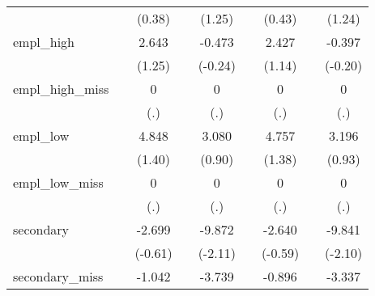 {\begin{tabular}{l*{8}{c}}
            &                     &      (0.38)         &                     &      (1.25)         &                     &      (0.43)         &                     &      (1.24)         \\
[1em]
empl\_high   &                     &       2.643         &                     &      -0.473         &                     &       2.427         &                     &      -0.397         \\
            &                     &      (1.25)         &                     &     (-0.24)         &                     &      (1.14)         &                     &     (-0.20)         \\
[1em]
empl\_high\_miss&                     &           0         &                     &           0         &                     &           0         &                     &           0         \\
            &                     &         (.)         &                     &         (.)         &                     &         (.)         &                     &         (.)         \\
[1em]
empl\_low    &                     &       4.848         &                     &       3.080         &                     &       4.757         &                     &       3.196         \\
            &                     &      (1.40)         &                     &      (0.90)         &                     &      (1.38)         &                     &      (0.93)         \\
[1em]
empl\_low\_miss&                     &           0         &                     &           0         &                     &           0         &                     &           0         \\
            &                     &         (.)         &                     &         (.)         &                     &         (.)         &                     &         (.)         \\
[1em]
secondary   &                     &      -2.699         &                     &      -9.872\sym{*}  &                     &      -2.640         &                     &      -9.841\sym{*}  \\
            &                     &     (-0.61)         &                     &     (-2.11)         &                     &     (-0.59)         &                     &     (-2.10)         \\
[1em]
secondary\_miss&                     &      -1.042         &                     &      -3.739         &                     &      -0.896         &                     &      -3.337         \\

\end{tabular}}
